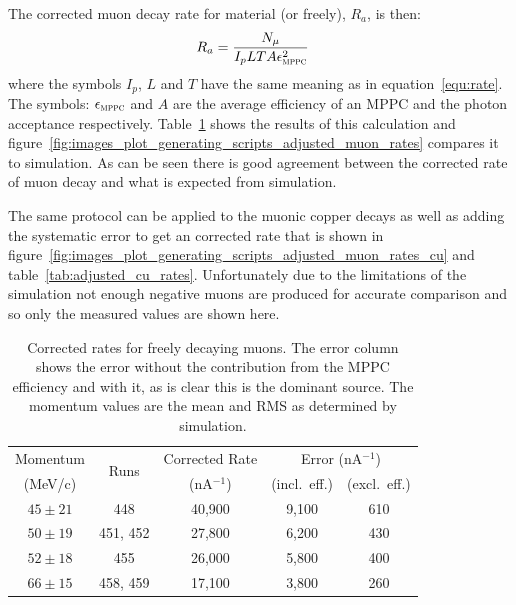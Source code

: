 The corrected muon decay rate for material (or freely), \( R_a \), is then:
\begin{align}
    R_a &= \frac{N_{\mu}}{I_p L T A \epsilon_{\textsc{mppc}}^2 } \label{equ:adj_rate}
\end{align}
where the symbols \(I_p\), \(L\) and \(T\) have the same meaning as in equation~\eqref{equ:rate}. The symbols:  \(\epsilon_{\textsc{mppc}}\) and \( A \) are the average efficiency of an MPPC and the photon acceptance respectively. Table~\ref{tab:adjusted_free_decay_rates} shows the results of this calculation and figure~\ref{fig:images_plot_generating_scripts_adjusted_muon_rates} compares it to simulation. As can be seen there is good agreement between the corrected rate of muon decay and what is expected from simulation.

The same protocol can be applied to the muonic copper decays as well as adding the systematic error to get an corrected rate that is shown in figure~\ref{fig:images_plot_generating_scripts_adjusted_muon_rates_cu} and table~\ref{tab:adjusted_cu_rates}. Unfortunately due to the limitations of the simulation not enough negative muons are produced for accurate comparison and so only the measured values are shown here.

\begin{table}
  \begin{center}
  \begin{tabular}{c | c | c | c | c}
    Momentum  & \multirow{2}{*}{Runs}  &  Corrected Rate           &  \multicolumn{2}{c}{Error (nA\(^{-1}\))} \\
     (MeV/c)  &                        &  (nA\(^{-1}\))  &     (incl.\ eff.)  &  (excl.\ eff.)      \\
    \hline
    \(45 \pm 21\)  &       448  &  40,900  &  9,100  &  610  \\
    \(50 \pm 19\)  &  451, 452  &  27,800  &  6,200  &  430  \\
    \(52 \pm 18\)  &       455  &  26,000  &  5,800  &  400  \\
    \(66 \pm 15\)  &  458, 459  &  17,100  &  3,800  &  260  \\
  \end{tabular}
  \end{center}
  \caption{Corrected rates for freely decaying muons. The error column shows the error without the contribution from the MPPC efficiency and with it, as is clear this is the dominant source. The momentum values are the mean and RMS as determined by simulation.}
  \label{tab:adjusted_free_decay_rates}
\end{table}

